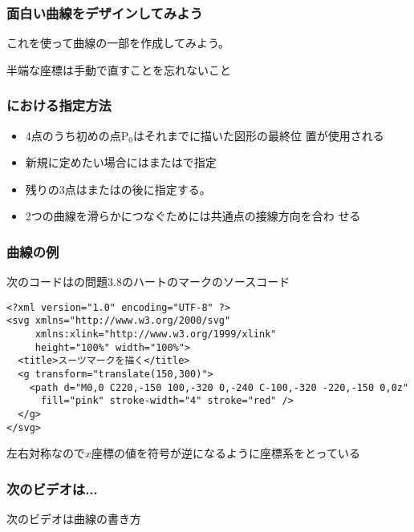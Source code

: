 \begin{frame}[containsverbatim]
 \frametitle{面白い曲線をデザインしてみよう}
 これを使って曲線の一部を作成してみよう。

 半端な座標は手動で直すことを忘れないこと
\end{frame}
\begin{frame}[containsverbatim]
 \frametitle{における指定方法}
 \begin{itemize}
  \item 4点のうち初めの点$\mathrm{P}_{0}$はそれまでに描いた図形の最終位
        置が使用される
  \item 新規に定めたい場合にはまたはで指定
  \item 残りの3点はまたはの後に指定する。
  \item 2つの\Bezier 曲線を滑らかにつなぐためには共通点の接線方向を合わ
        せる
 \end{itemize}
\end{frame}
\begin{frame}[containsverbatim]
 \frametitle{\Bezier 曲線の例}
 次のコードはの問題3.8のハートのマークのソースコード
\begin{Verbatim}[fontsize=\footnotesize]
<?xml version="1.0" encoding="UTF-8" ?>
<svg xmlns="http://www.w3.org/2000/svg"
     xmlns:xlink="http://www.w3.org/1999/xlink"
     height="100%" width="100%">
  <title>スーツマークを描く</title>
  <g transform="translate(150,300)">
    <path d="M0,0 C220,-150 100,-320 0,-240 C-100,-320 -220,-150 0,0z"
      fill="pink" stroke-width="4" stroke="red" />
  </g>
</svg>
 \end{Verbatim}
 左右対称なので$x$座標の値を符号が逆になるように座標系をとっている
\end{frame}
\else
\begin{frame}[containsverbatim]
 \frametitle{次のビデオは...}
次のビデオは曲線の書き方
\end{frame}
\fi

\begin{frame}[containsverbatim]
\frametitle{}
\end{frame}


